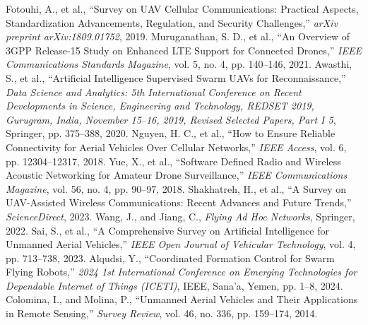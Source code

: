 \documentclass{article}
\begin{document}
\begin{thebibliography}{10}


 Fotouhi, A., et al., ``Survey on UAV Cellular Communications: Practical Aspects, Standardization Advancements, Regulation, and Security Challenges,'' \textit{arXiv preprint arXiv:1809.01752}, 2019.
 Muruganathan, S. D., et al., ``An Overview of 3GPP Release-15 Study on Enhanced LTE Support for Connected Drones,'' \textit{IEEE Communications Standards Magazine}, vol. 5, no. 4, pp. 140--146, 2021.
 Awasthi, S., et al., ``Artificial Intelligence Supervised Swarm UAVs for Reconnaissance,'' \textit{Data Science and Analytics: 5th International Conference on Recent Developments in Science, Engineering and Technology, REDSET 2019, Gurugram, India, November 15--16, 2019, Revised Selected Papers, Part I 5}, Springer, pp. 375--388, 2020.
 Nguyen, H. C., et al., ``How to Ensure Reliable Connectivity for Aerial Vehicles Over Cellular Networks,'' \textit{IEEE Access}, vol. 6, pp. 12304--12317, 2018.
 Yue, X., et al., ``Software Defined Radio and Wireless Acoustic Networking for Amateur Drone Surveillance,'' \textit{IEEE Communications Magazine}, vol. 56, no. 4, pp. 90--97, 2018.
 Shakhatreh, H., et al., ``A Survey on UAV-Assisted Wireless Communications: Recent Advances and Future Trends,'' \textit{ScienceDirect}, 2023.
 Wang, J., and Jiang, C., \textit{Flying Ad Hoc Networks}, Springer, 2022.
 Sai, S., et al., ``A Comprehensive Survey on Artificial Intelligence for Unmanned Aerial Vehicles,'' \textit{IEEE Open Journal of Vehicular Technology}, vol. 4, pp. 713--738, 2023.
 Alqudsi, Y., ``Coordinated Formation Control for Swarm Flying Robots,'' \textit{2024 1st International Conference on Emerging Technologies for Dependable Internet of Things (ICETI)}, IEEE, Sana’a, Yemen, pp. 1--8, 2024.
 Colomina, I., and Molina, P., ``Unmanned Aerial Vehicles and Their Applications in Remote Sensing,'' \textit{Survey Review}, vol. 46, no. 336, pp. 159--174, 2014.



\end{thebibliography}
\end{document}

